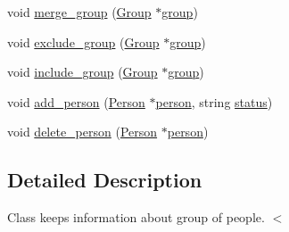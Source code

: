 \begin{DoxyCompactItemize}
void \hyperlink{classGroup_a2aca17525330aeaf591e0bc243a8149e}{merge\_\-group} (\hyperlink{classGroup}{Group} $\ast$\hyperlink{group__content_8h_a27517aa1480ab2d9bfe5d62e693b33eb}{group})
\item 
void \hyperlink{classGroup_a7fccd60929bd2e36db09fe37fffe0548}{exclude\_\-group} (\hyperlink{classGroup}{Group} $\ast$\hyperlink{group__content_8h_a27517aa1480ab2d9bfe5d62e693b33eb}{group})
\item 
void \hyperlink{classGroup_ac753fa2674ec19ab156645f978654961}{include\_\-group} (\hyperlink{classGroup}{Group} $\ast$\hyperlink{group__content_8h_a27517aa1480ab2d9bfe5d62e693b33eb}{group})
\item 
void \hyperlink{classGroup_afc2080f42e091f6831fd9d80e7b8f0d9}{add\_\-person} (\hyperlink{classPerson}{Person} $\ast$\hyperlink{group__content_8h_ab8664e6fd42f01eeaad084b5e20eb54e}{person}, string \hyperlink{group__content_8h_ab4d38e7365d935f2a5f1403eec29127e}{status})
\item 
void \hyperlink{classGroup_ad00847c4219c29fd3b94c6784870b629}{delete\_\-person} (\hyperlink{classPerson}{Person} $\ast$\hyperlink{group__content_8h_ab8664e6fd42f01eeaad084b5e20eb54e}{person})
\end{DoxyCompactItemize}


\subsection{Detailed Description}
Class keeps information about group of people. $<$ 

